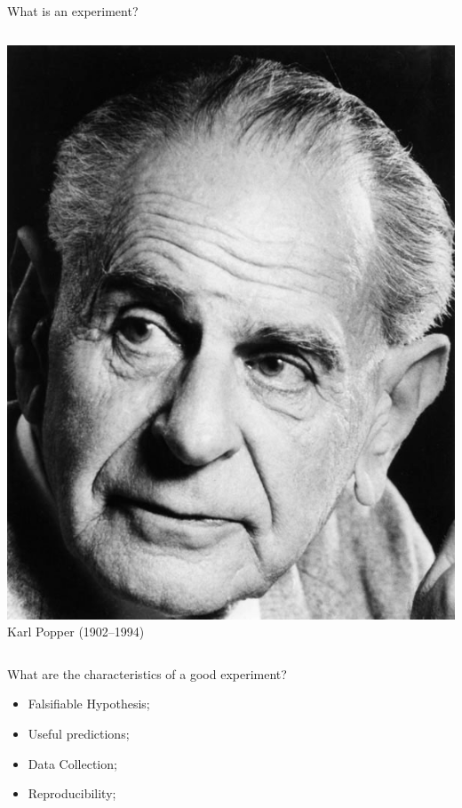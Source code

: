 \documentclass{beamer}
\begin{document}
\begin{CJK}{UTF8}{ipxm}
\begin{frame}{What is an experiment?}
\begin{columns}[t]
    \includegraphics[width=1\textwidth]{../img/wikipedia_popper}\\
    Karl Popper (1902--1994)
  \end{columns}
\end{frame}


\begin{frame}{What are the characteristics of a good experiment?}
  \begin{itemize}
    \item Falsifiable Hypothesis;
    \item Useful predictions;
    \item Data Collection;
    \item Reproducibility;
  \end{itemize}
\end{frame}


\end{CJK}
\end{document}

